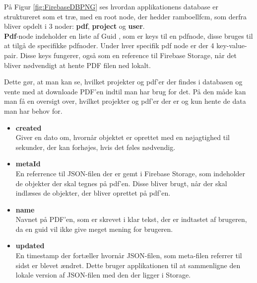 På Figur \ref{fig:FirebaseDBPNG} ses hvordan applikationens database er struktureret som et træ, med en root node\cite{rootNode}, der hedder ramboellfcm, som derfra bliver opdelt i 3 noder:
\textbf{pdf}, \textbf{project} og \textbf{user}.\\

\textbf{Pdf}-node indeholder en liste af Guid \cite{GUID}, som er keys til en pdfnode, disse bruges til at tilgå de specifikke pdfnoder. Under hver specifik pdf node er der 4 key-value-pair\cite{KVP}. Disse keys fungerer, også som en reference til Firebase Storage, når det bliver nødvendigt at hente PDF filen ned lokalt.

Dette gør, at man kan se, hvilket projekter og pdf'er der findes i databasen og vente med at downloade PDF'en indtil man har brug for det. På den måde kan man få en oversigt over, hvilket projekter og pdf'er der er og kun hente de data man har behov for. 
\begin{itemize}
	\item \textbf{created}\\
	Giver en dato om, hvornår objektet er oprettet med en nøjagtighed til sekunder, der kan forhøjes, hvis det føles nødvendig.\\
	\item \textbf{metaId}\\
	En referrence til JSON-filen der er gemt i Firebase Storage\cite{FirebaseStorage}, som indeholder de objekter der skal tegnes på pdf'en. Disse bliver brugt, når der skal indlæses de objekter, der bliver oprettet på pdf'en.\\ 
	
	\item \textbf{name}\\
	Navnet på PDF'en, som er skrevet i klar tekst, der er indtastet af brugeren, da en guid vil ikke give meget mening for brugeren.\\
	
	\item \textbf{updated}\\
	En timestamp der fortæller hvornår JSON-filen, som meta-filen referrer til sidst er blevet ændret. Dette bruger applikationen til at sammenligne den lokale version af JSON-filen med den der ligger i Storage.   
\end{itemize}

